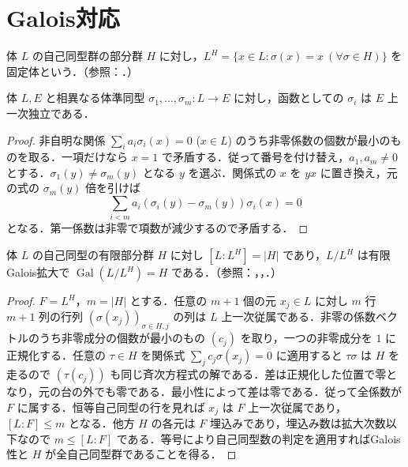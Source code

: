 \section{Galois対応}
\begin{defn}[固定体]
体 $L$ の自己同型群の部分群 $H$ に対し，$L^H=\{x\in L:\sigma(x)=x\ (\forall\sigma\in H)\}$ を固定体という．（参照：．）
\end{defn}
\begin{prop}[相異なる体準同型の一次独立性]
体 $L,E$ と相異なる体準同型 $\sigma_1,\ldots,\sigma_m:L\to E$ に対し，函数としての $\sigma_i$ は $E$ 上一次独立である．
\end{prop}
\begin{proof}
非自明な関係 $\sum_i a_i\sigma_i(x)=0$ ($x\in L$) のうち非零係数の個数が最小のものを取る．一項だけなら $x=1$ で矛盾する．従って番号を付け替え，$a_1,a_m\ne0$ とする．$\sigma_1(y)\ne\sigma_m(y)$ となる $y$ を選ぶ．関係式の $x$ を $yx$ に置き換え，元の式の $\sigma_m(y)$ 倍を引けば
\[
\sum_{i<m}a_i(\sigma_i(y)-\sigma_m(y))\sigma_i(x)=0
\]
となる．第一係数は非零で項数が減少するので矛盾する．
\end{proof}
\begin{prop}[Artinの固定体定理]
体 $L$ の自己同型の有限部分群 $H$ に対し $[L:L^H]=|H|$ であり，$L/L^H$ は有限Galois拡大で $\operatorname{Gal}(L/L^H)=H$ である．（参照：，，．）
\end{prop}
\begin{proof}
$F=L^H$，$m=|H|$ とする．任意の $m+1$ 個の元 $x_j\in L$ に対し $m$ 行 $m+1$ 列の行列 $(\sigma(x_j))_{\sigma\in H,j}$ の列は $L$ 上一次従属である．非零の係数ベクトルのうち非零成分の個数が最小のもの $(c_j)$ を取り，一つの非零成分を $1$ に正規化する．任意の $\tau\in H$ を関係式 $\sum_j c_j\sigma(x_j)=0$ に適用すると $\tau\sigma$ は $H$ を走るので $(\tau(c_j))$ も同じ斉次方程式の解である．差は正規化した位置で零となり，元の台の外でも零である．最小性によって差は零である．従って全係数が $F$ に属する．恒等自己同型の行を見れば $x_j$ は $F$ 上一次従属であり，$[L:F]\le m$ となる．他方 $H$ の各元は $F$ 埋込みであり，埋込み数は拡大次数以下なので $m\le[L:F]$ である．等号により自己同型数の判定を適用すればGalois性と $H$ が全自己同型群であることを得る．
\end{proof}

